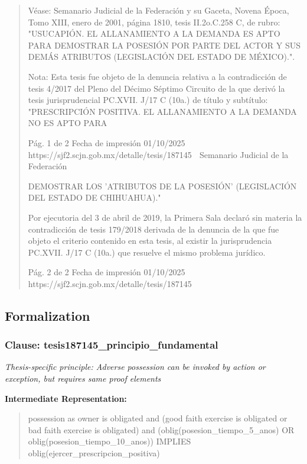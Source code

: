 \documentclass[11pt,a4paper]{article}
\begin{document}
\begin{quote}
Véase: Semanario Judicial de la Federación y su Gaceta, Novena Época, Tomo XIII, enero de 2001,
página 1810, tesis II.2o.C.258 C, de rubro: "USUCAPIÓN. EL ALLANAMIENTO A LA DEMANDA ES
APTO PARA DEMOSTRAR LA POSESIÓN POR PARTE DEL ACTOR Y SUS DEMÁS ATRIBUTOS
(LEGISLACIÓN DEL ESTADO DE MÉXICO).".

Nota: Esta tesis fue objeto de la denuncia relativa a la contradicción de tesis 4/2017 del Pleno del
Décimo Séptimo Circuito de la que derivó la tesis jurisprudencial PC.XVII. J/17 C (10a.) de título y
subtítulo: "PRESCRIPCIÓN POSITIVA. EL ALLANAMIENTO A LA DEMANDA NO ES APTO PARA


                                             Pág. 1 de 2              Fecha de impresión 01/10/2025
  https://sjf2.scjn.gob.mx/detalle/tesis/187145
                                                  Semanario Judicial de la Federación

DEMOSTRAR LOS 'ATRIBUTOS DE LA POSESIÓN' (LEGISLACIÓN DEL ESTADO DE
CHIHUAHUA)."

Por ejecutoria del 3 de abril de 2019, la Primera Sala declaró sin materia la contradicción de tesis
179/2018 derivada de la denuncia de la que fue objeto el criterio contenido en esta tesis, al existir la
jurisprudencia PC.XVII. J/17 C (10a.) que resuelve el mismo problema jurídico.




                                              Pág. 2 de 2              Fecha de impresión 01/10/2025
  https://sjf2.scjn.gob.mx/detalle/tesis/187145

\end{quote}

\subsection{Formalization}

\subsubsection{Clause: tesis187145\_principio\_fundamental}

\textit{Thesis-specific principle: Adverse possession can be invoked by action or exception, but requires same proof elements}

\textbf{Intermediate Representation:}

\begin{quote}
possession as owner is obligated and (good faith exercise is obligated or bad faith exercise is obligated) and (oblig(posesion\_tiempo\_5\_anos) OR oblig(posesion\_tiempo\_10\_anos)) IMPLIES oblig(ejercer\_prescripcion\_positiva)
\end{quote}
\end{document}
